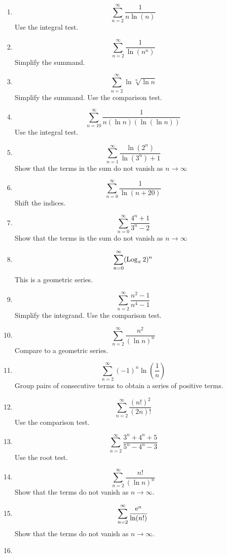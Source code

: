 {\begin{Hint}
  \label{hint convergence 1/ ln(nn)}
  \begin{enumerate}
  \item
    \[
    \sum_{n=2}^\infty \frac{1}{n \ln(n)}
    \]
    Use the integral test.
  \item
    \[
    \sum_{n=2}^\infty \frac{1}{\ln \left( n^n \right)}
    \]
    Simplify the summand.
  \item
    \[
    \sum_{n=2}^\infty \ln \sqrt[n]{\ln n}
    \]
    Simplify the summand.  Use the comparison test.
  \item
    \[
    \sum_{n=10}^\infty \frac{1}{ n (\ln n) (\ln(\ln n)) }
    \]
    Use the integral test.
  \item
    \[
    \sum_{n=1}^\infty \frac{ \ln \left( 2^n \right) }{ \ln \left( 3^n \right) + 1 }
    \]
    Show that the terms in the sum do not vanish as $n \to \infty$
  \item
    \[ 
    \sum_{n=0}^\infty \frac{1}{\ln(n + 20)}
    \]
    Shift the indices.
  \item
    \[
    \sum_{n=0}^\infty \frac{4^n + 1}{3^n - 2}
    \]
    Show that the terms in the sum do not vanish as $n \to \infty$
  \item
    \[
    \sum_{n=0}^\infty (\mathop{\mathrm{Log}}\nolimits_\pi 2)^n
    \]
    This is a geometric series.
  \item
    \[
    \sum_{n=2}^\infty \frac{n^2 - 1}{n^4 - 1}
    \]
    Simplify the integrand.  Use the comparison test.
  \item
    \[
    \sum_{n=2}^\infty \frac{n^2}{(\ln n)^n}
    \]
    Compare to a geometric series.
  \item
    \[
    \sum_{n=2}^\infty (-1)^n \ln \left( \frac{1}{n} \right)
    \]
    Group pairs of consecutive terms to obtain a series of positive terms.
  \item
    \[
    \sum_{n=2}^\infty \frac{ (n!)^2 }{ (2 n)! }
    \]
    Use the comparison test.
  \item
    \[
    \sum_{n=2}^\infty \frac{3^n + 4^n + 5}{5^n - 4^n - 3}
    \]
    Use the root test.
  \item
    \[
    \sum_{n=2}^\infty \frac{ n! }{ (\ln n)^n }
    \]
    Show that the terms do not vanish as $n \to \infty$.
  \item
    \[
    \sum_{n=2}^\infty \frac{\mathop{\mathrm{e}}\nolimits^n}{\ln(n!)}
    \]
    Show that the terms do not vanish as $n \to \infty$.
  \item

\end{enumerate}
\end{Hint}}
